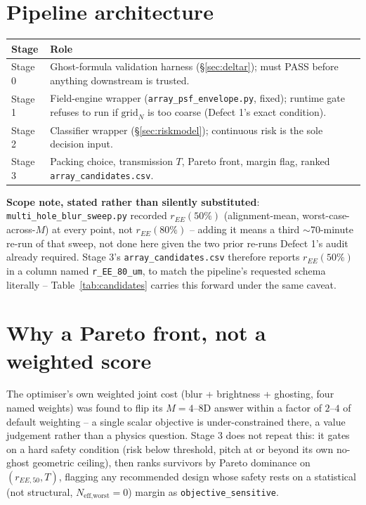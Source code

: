 \documentclass[11pt]{report}
\begin{document}
\section{Pipeline architecture}
\label{sec:pipelinearchitecture}
\begin{longtable}{p{2.6cm}p{11.5cm}}
\toprule
\textbf{Stage} & \textbf{Role} \\
\midrule
\endhead
Stage 0 & Ghost-formula validation harness (\S\ref{sec:deltar}); must PASS before anything downstream is trusted. \\
Stage 1 & Field-engine wrapper (\texttt{array\_psf\_envelope.py}, fixed); runtime gate refuses to run if $\text{grid}_N$ is too coarse (Defect 1's exact condition). \\
Stage 2 & Classifier wrapper (\S\ref{sec:riskmodel}); continuous risk is the sole decision input. \\
Stage 3 & Packing choice, transmission $T$, Pareto front, margin flag, ranked \texttt{array\_candidates.csv}. \\
\bottomrule
\end{longtable}

\textbf{Scope note, stated rather than silently substituted}: \texttt{multi\_hole\_blur\_sweep.py}
recorded $r_{EE}(50\%)$ (alignment-mean, worst-case-across-$M$) at every point, not
$r_{EE}(80\%)$ -- adding it means a third $\sim$70-minute re-run of that sweep, not done
here given the two prior re-runs Defect 1's audit already required. Stage 3's
\texttt{array\_candidates.csv} therefore reports $r_{EE}(50\%)$ in a column named
\texttt{r\_EE\_80\_um}, to match the pipeline's requested schema literally -- Table~\ref{tab:candidates}
carries this forward under the same caveat.

\section{Why a Pareto front, not a weighted score}
\label{sec:whyPareto}
The optimiser's own weighted joint cost (blur + brightness + ghosting, four named weights)
was found to flip its $M{=}4$--$8$D answer within a factor of $2$--$4$ of default weighting
-- a single scalar objective is under-constrained there, a value judgement rather than a
physics question. Stage 3 does not repeat this: it gates on a hard safety condition (risk
below threshold, pitch at or beyond its own no-ghost geometric ceiling), then ranks survivors
by Pareto dominance on $(r_{EE,50}, T)$, flagging any recommended design whose safety rests
on a statistical (not structural, $N_{\text{eff,worst}}{=}0$) margin as
\texttt{objective\_sensitive}.
\end{document}
